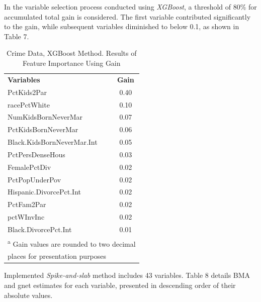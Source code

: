 \documentclass[
  11pt,
]{article}
\begin{document}
In the variable selection process conducted using \emph{XGBoost}, a
threshold of 80\% for accumulated total gain is considered. The first
variable contributed significantly to the gain, while subsequent
variables diminished to below 0.1, as shown in Table 7.

\begin{table}[H]

\caption{\label{tab:Xgboost Results}Crime Data, XGBoost Method. Results of Feature Importance Using Gain}
\centering
\fontsize{10}{12}\selectfont
\begin{tabular}[t]{>{}l|>{}c|}
\toprule
\textbf{Variables} & \textbf{Gain}\\
\addlinespace
\midrule
PctKids2Par & 0.40\\
racePctWhite & 0.10\\
NumKidsBornNeverMar & 0.07\\
PctKidsBornNeverMar & 0.06\\
Black.KidsBornNeverMar.Int & 0.05\\
\addlinespace
PctPersDenseHous & 0.03\\
FemalePctDiv & 0.02\\
PctPopUnderPov & 0.02\\
Hispanic.DivorcePct.Int & 0.02\\
PctFam2Par & 0.02\\
\addlinespace
pctWInvInc & 0.02\\
Black.DivorcePct.Int & 0.01\\
\bottomrule
\multicolumn{2}{l}{\textsuperscript{a} Gain values are rounded to two decimal}\\
\multicolumn{2}{l}{places for presentation purposes}\\
\end{tabular}
\end{table}

Implemented \emph{Spike-and-slab} method includes 43 variables. Table 8
details BMA and gnet estimates for each variable, presented in
descending order of their absolute values.

\begingroup\fontsize{10}{12}\selectfont
\end{document}

